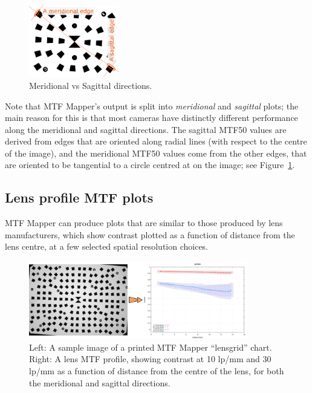 \documentclass[a4paper]{article}
\begin{document}
\begin{figure}
\centering
\includegraphics[width=0.35\textwidth]{figures/meridional_sagittal}
\caption{Meridional vs Sagittal directions.}
\label{fig:ms_directions}
\end{figure}

Note that MTF Mapper's output is split into \emph{meridional} and
\emph{sagittal} plots; the main reason for this is that most cameras have
distinctly different performance along the meridional and sagittal
directions. The sagittal MTF50 values are derived from edges that are
oriented along radial lines (with respect to the centre of the image), and
the meridional MTF50 values come from the other edges, that are oriented to
be tangential to a circle centred at on the image; see
Figure~\ref{fig:ms_directions}.

\subsection{Lens profile MTF plots} 
\label{sec:lens_profile}
MTF Mapper can produce plots that are similar to those produced by lens
manufacturers, which show contrast plotted as a function of distance from
the lens centre, at a few selected spatial resolution choices.

\begin{figure}[!ht]
\centering
\includegraphics[width=0.85\textwidth]{figures/lensprofile_example}
\caption{Left: A sample image of a printed MTF Mapper ``lensgrid'' chart.
Right: A lens MTF profile, showing contrast at 10 lp/mm and 30 lp/mm as a
function of distance from the centre of the lens, for both the meridional
and sagittal directions.}
\label{fig:lensprofile}
\end{figure}
\end{document}
